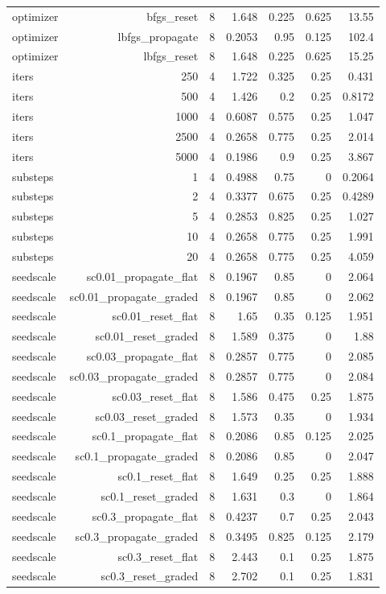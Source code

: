 \begin{tabular}{lrrrrrr}
optimizer & bfgs\_reset & 8 & 1.648 & 0.225 & 0.625 & 13.55 \\
optimizer & lbfgs\_propagate & 8 & 0.2053 & 0.95 & 0.125 & 102.4 \\
optimizer & lbfgs\_reset & 8 & 1.648 & 0.225 & 0.625 & 15.25 \\
iters & 250 & 4 & 1.722 & 0.325 & 0.25 & 0.431 \\
iters & 500 & 4 & 1.426 & 0.2 & 0.25 & 0.8172 \\
iters & 1000 & 4 & 0.6087 & 0.575 & 0.25 & 1.047 \\
iters & 2500 & 4 & 0.2658 & 0.775 & 0.25 & 2.014 \\
iters & 5000 & 4 & 0.1986 & 0.9 & 0.25 & 3.867 \\
substeps & 1 & 4 & 0.4988 & 0.75 & 0 & 0.2064 \\
substeps & 2 & 4 & 0.3377 & 0.675 & 0.25 & 0.4289 \\
substeps & 5 & 4 & 0.2853 & 0.825 & 0.25 & 1.027 \\
substeps & 10 & 4 & 0.2658 & 0.775 & 0.25 & 1.991 \\
substeps & 20 & 4 & 0.2658 & 0.775 & 0.25 & 4.059 \\
seedscale & sc0.01\_propagate\_flat & 8 & 0.1967 & 0.85 & 0 & 2.064 \\
seedscale & sc0.01\_propagate\_graded & 8 & 0.1967 & 0.85 & 0 & 2.062 \\
seedscale & sc0.01\_reset\_flat & 8 & 1.65 & 0.35 & 0.125 & 1.951 \\
seedscale & sc0.01\_reset\_graded & 8 & 1.589 & 0.375 & 0 & 1.88 \\
seedscale & sc0.03\_propagate\_flat & 8 & 0.2857 & 0.775 & 0 & 2.085 \\
seedscale & sc0.03\_propagate\_graded & 8 & 0.2857 & 0.775 & 0 & 2.084 \\
seedscale & sc0.03\_reset\_flat & 8 & 1.586 & 0.475 & 0.25 & 1.875 \\
seedscale & sc0.03\_reset\_graded & 8 & 1.573 & 0.35 & 0 & 1.934 \\
seedscale & sc0.1\_propagate\_flat & 8 & 0.2086 & 0.85 & 0.125 & 2.025 \\
seedscale & sc0.1\_propagate\_graded & 8 & 0.2086 & 0.85 & 0 & 2.047 \\
seedscale & sc0.1\_reset\_flat & 8 & 1.649 & 0.25 & 0.25 & 1.888 \\
seedscale & sc0.1\_reset\_graded & 8 & 1.631 & 0.3 & 0 & 1.864 \\
seedscale & sc0.3\_propagate\_flat & 8 & 0.4237 & 0.7 & 0.25 & 2.043 \\
seedscale & sc0.3\_propagate\_graded & 8 & 0.3495 & 0.825 & 0.125 & 2.179 \\
seedscale & sc0.3\_reset\_flat & 8 & 2.443 & 0.1 & 0.25 & 1.875 \\
seedscale & sc0.3\_reset\_graded & 8 & 2.702 & 0.1 & 0.25 & 1.831 \\
\bottomrule
\end{tabular}
